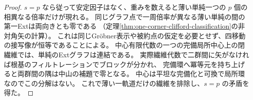 \begin{proof}
$s=p$ なら従って安定因子はなく、重みを数えると薄い単純一つの $p$ 個の相異なる倍率だけが現れる。
同じグラフ点で一周倍率が異なる薄い単純の間の第一Extは両向きとも零である
（定理\ref{thm:one-corner-clifford-classification}の非対角矢の計算）。
これは同じGröbner表示や被約点の仮定を必要とせず、四移動の接写像が恒等であることによる。
中心有限代数の一つの完備局所中心上の閉繊維では、単純のExtグラフは連結である。
実際繊維代数で二群間に矢がなければ根基のフィルトレーションでブロックが分かれ、
完備環へ冪等元を持ち上げると両群間の隅は中山の補題で零となる。
中心は平坦な完備化と可換で局所環なのでこの分解はない。
これで薄い一軌道だけの繊維を排除し、$s=p$ の矛盾を得た。
\end{proof}
